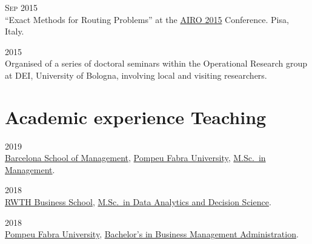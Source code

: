 \begin{paracol}{2}
  \textsc{Sep 2015}
\switchcolumn
  \\
  ``Exact Methods for Routing Problems'' at the \href{http://web.archive.org/web/20150924164917/http://www.airo.org/conferences/airo2015/}{AIRO 2015} Conference.
  Pisa, Italy.
\end{paracol}

\begin{paracol}{2}
  \textsc{2015}
\switchcolumn
  \\
  Organised of a series of doctoral seminars within the Operational Research group at DEI, University of Bologna, involving local and visiting researchers.
\end{paracol}

\section*{Academic experience {\small Teaching}}

\begin{paracol}{2}
  \textsc{2019}
\switchcolumn
  \\
  \href{https://www.barcelonaschoolofmanagement.upf.edu/en}{Barcelona School of Management}, \href{https://www.upf.edu}{Pompeu Fabra University}, \href{https://www.barcelonaschoolofmanagement.upf.edu/en/master-of-science-in-management-specialization-in-business-analytics/study-plan}{M.Sc.\ in Management}.
\end{paracol}

\begin{paracol}{2}
  \textsc{2018}
\switchcolumn
  \\
  \href{https://www.business-school.rwth-aachen.de/en/}{RWTH Business School}, \href{https://www.business-school.rwth-aachen.de/en/programs/degree-programs/mme-dds/overview}{M.Sc.\ in Data Analytics and Decision Science}.
\end{paracol}

\begin{paracol}{2}
  \textsc{2018}
\switchcolumn
  \\
  \href{https://www.upf.edu/}{Pompeu Fabra University}, \href{https://www.upf.edu/es/web/graus/grau-ade}{Bachelor's in Business Management Administration}.
\end{paracol}


